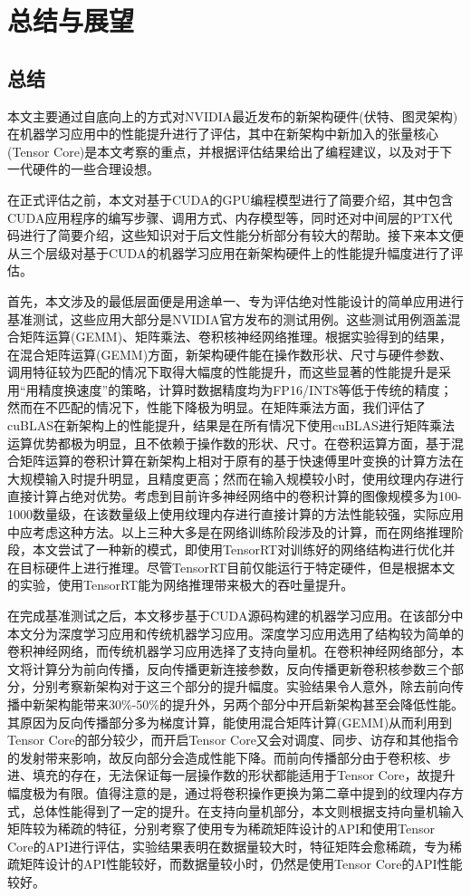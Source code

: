 \newpage
\section{总结与展望}
\setcounter{table}{0}
\setcounter{figure}{0}
\subsection{总结}
\par 本文主要通过自底向上的方式对NVIDIA最近发布的新架构硬件(伏特、图灵架构)在机器学习应用中的性能提升进行了评估，其中在新架构中新加入的张量核心(Tensor Core)是本文考察的重点，并根据评估结果给出了编程建议，以及对于下一代硬件的一些合理设想。
\par 在正式评估之前，本文对基于CUDA的GPU编程模型进行了简要介绍，其中包含CUDA应用程序的编写步骤、调用方式、内存模型等，同时还对中间层的PTX代码进行了简要介绍，这些知识对于后文性能分析部分有较大的帮助。接下来本文便从三个层级对基于CUDA的机器学习应用在新架构硬件上的性能提升幅度进行了评估。
\par 首先，本文涉及的最低层面便是用途单一、专为评估绝对性能设计的简单应用进行基准测试，这些应用大部分是NVIDIA官方发布的测试用例。这些测试用例涵盖混合矩阵运算(GEMM)、矩阵乘法、卷积核神经网络推理。根据实验得到的结果，在混合矩阵运算(GEMM)方面，新架构硬件能在操作数形状、尺寸与硬件参数、调用特征较为匹配的情况下取得大幅度的性能提升，而这些显著的性能提升是采用“用精度换速度”的策略，计算时数据精度均为FP16/INT8等低于传统的精度；然而在不匹配的情况下，性能下降极为明显。在矩阵乘法方面，我们评估了cuBLAS在新架构上的性能提升，结果是在所有情况下使用cuBLAS进行矩阵乘法运算优势都极为明显，且不依赖于操作数的形状、尺寸。在卷积运算方面，基于混合矩阵运算的卷积计算在新架构上相对于原有的基于快速傅里叶变换的计算方法在大规模输入时提升明显，且精度更高；然而在输入规模较小时，使用纹理内存进行直接计算占绝对优势。考虑到目前许多神经网络中的卷积计算的图像规模多为100-1000数量级，在该数量级上使用纹理内存进行直接计算的方法性能较强，实际应用中应考虑这种方法。以上三种大多是在网络训练阶段涉及的计算，而在网络推理阶段，本文尝试了一种新的模式，即使用TensorRT对训练好的网络结构进行优化并在目标硬件上进行推理。尽管TensorRT目前仅能运行于特定硬件，但是根据本文的实验，使用TensorRT能为网络推理带来极大的吞吐量提升。
\par 在完成基准测试之后，本文移步基于CUDA源码构建的机器学习应用。在该部分中本文分为深度学习应用和传统机器学习应用。深度学习应用选用了结构较为简单的卷积神经网络，而传统机器学习应用选择了支持向量机。在卷积神经网络部分，本文将计算分为前向传播，反向传播更新连接参数，反向传播更新卷积核参数三个部分，分别考察新架构对于这三个部分的提升幅度。实验结果令人意外，除去前向传播中新架构能带来30\%-50\%的提升外，另两个部分中开启新架构甚至会降低性能。其原因为反向传播部分多为梯度计算，能使用混合矩阵计算(GEMM)从而利用到Tensor Core的部分较少，而开启Tensor Core又会对调度、同步、访存和其他指令的发射带来影响，故反向部分会造成性能下降。而前向传播部分由于卷积核、步进、填充的存在，无法保证每一层操作数的形状都能适用于Tensor Core，故提升幅度极为有限。值得注意的是，通过将卷积操作更换为第二章中提到的纹理内存方式，总体性能得到了一定的提升。在支持向量机部分，本文则根据支持向量机输入矩阵较为稀疏的特征，分别考察了使用专为稀疏矩阵设计的API和使用Tensor Core的API进行评估，实验结果表明在数据量较大时，特征矩阵会愈稀疏，专为稀疏矩阵设计的API性能较好，而数据量较小时，仍然是使用Tensor Core的API性能较好。
